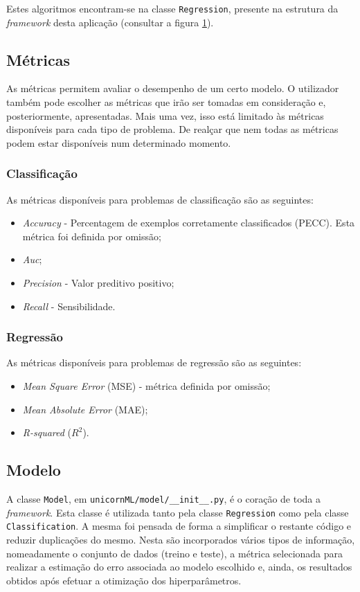 \documentclass[a4paper]{report}
\begin{document}
{			Estes algoritmos encontram-se na classe \texttt{Regression}, presente na estrutura da \textit{framework} desta aplicação (consultar a figura \hyperref[fig:1]{1}).

		\subsection{Métricas} \label{subsec:Metrics}
		As métricas permitem avaliar o desempenho de um certo modelo. 
		O utilizador também pode escolher as métricas que irão ser tomadas em consideração e, posteriormente, apresentadas.
		Mais uma vez, isso está limitado às métricas disponíveis para cada tipo de problema.
		De realçar que nem todas as métricas podem estar disponíveis num determinado momento.

            \subsubsection{Classificação} \label{sssec:Classification2}
			As métricas disponíveis para problemas de classificação são as seguintes:
			\begin{itemize}
				\item \textit{Accuracy} - Percentagem de exemplos corretamente classificados (PECC). Esta métrica foi definida por omissão;
				\item \textit{Auc};
				\item \textit{Precision} - Valor preditivo positivo;
				\item \textit{Recall} - Sensibilidade.
			\end{itemize}

            \subsubsection{Regressão} \label{sssec:Regression2}
			As métricas disponíveis para problemas de regressão são as seguintes:
			\begin{itemize}
				\item \textit{Mean Square Error} (MSE) - métrica definida por omissão;
				\item \textit{Mean Absolute Error} (MAE);
				\item \textit{R-squared} ($R^{2}$).
			\end{itemize}

		\subsection{Modelo}
		A classe \texttt{Model}, em \texttt{unicornML/model/\_\_init\_\_.py}, é o coração de toda a \textit{framework}.
		Esta classe é utilizada tanto pela classe \texttt{Regression} como pela classe \texttt{Classification}.
		A mesma foi pensada de forma a simplificar o restante código e reduzir duplicações do mesmo.
		Nesta são incorporados vários tipos de informação, nomeadamente o conjunto de dados (treino e teste), a métrica selecionada para realizar a estimação do erro associada ao modelo escolhido e, ainda, os resultados obtidos após efetuar a otimização dos hiperparâmetros.

}
\end{document}
